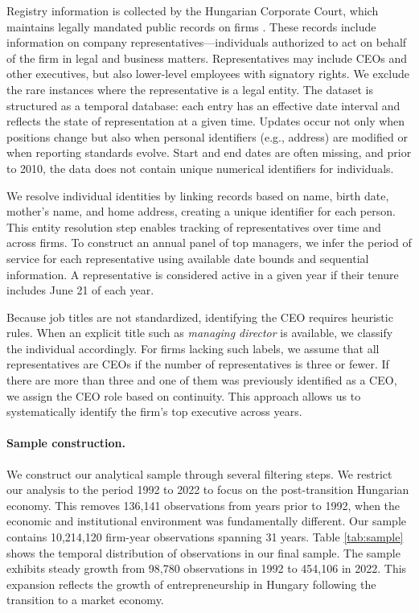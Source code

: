 \documentclass[11pt,a4paper]{article}
\begin{document}
Registry information is collected by the Hungarian Corporate Court, which maintains legally mandated public records on firms \citep{cegtv}. These records include information on company representatives---individuals authorized to act on behalf of the firm in legal and business matters. Representatives may include CEOs and other executives, but also lower-level employees with signatory rights. We exclude the rare instances where the representative is a legal entity. The dataset is structured as a temporal database: each entry has an effective date interval and reflects the state of representation at a given time. Updates occur not only when positions change but also when personal identifiers (e.g., address) are modified or when reporting standards evolve. Start and end dates are often missing, and prior to 2010, the data does not contain unique numerical identifiers for individuals.

We resolve individual identities by linking records based on name, birth date, mother's name, and home address, creating a unique identifier for each person. This entity resolution step enables tracking of representatives over time and across firms. To construct an annual panel of top managers, we infer the period of service for each representative using available date bounds and sequential information. A representative is considered active in a given year if their tenure includes June 21 of each year.

Because job titles are not standardized, identifying the CEO requires heuristic rules. When an explicit title such as \emph{managing director} is available, we classify the individual accordingly. For firms lacking such labels, we assume that all representatives are CEOs if the number of representatives is three or fewer. If there are more than three and one of them was previously identified as a CEO, we assign the CEO role based on continuity. This approach allows us to systematically identify the firm's top executive across years.

\paragraph{Sample construction.} We construct our analytical sample through several filtering steps. We restrict our analysis to the period 1992 to 2022 to focus on the post-transition Hungarian economy. This removes 136,141 observations from years prior to 1992, when the economic and institutional environment was fundamentally different. Our sample contains 10,214,120 firm-year observations spanning 31 years. Table \ref{tab:sample} shows the temporal distribution of observations in our final sample. The sample exhibits steady growth from 98,780 observations in 1992 to 454,106 in 2022. This expansion reflects the growth of entrepreneurship in Hungary following the transition to a market economy.
\end{document}
